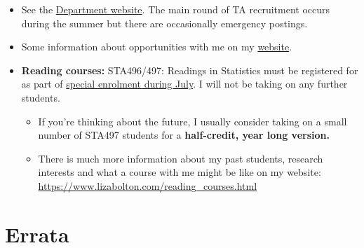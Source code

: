 \documentclass[
  openany]{book}
\begin{document}
\begin{itemize}
\item
  See the \href{https://www.statistics.utoronto.ca/employment-opportunities/cupe-positions-unit-1}{Department website}. The main round of TA recruitment occurs during the summer but there are occasionally emergency postings.
\item
  Some information about opportunities with me on my \href{https://www.lizabolton.com/opportunities.html}{website}.
\item
  \textbf{Reading courses:} STA496/497: Readings in Statistics must be registered for as part of \href{https://utoronto.sharepoint.com/sites/ArtSci-STA/Undergrad/SitePages/Special-Enrolment-Courses--STA490Y1,-STA492H1-and-STA496H1-STA497H1.aspx}{special enrolment during July}. I will not be taking on any further students.

  \begin{itemize}
  \item
    If you're thinking about the future, I usually consider taking on a small number of STA497 students for a \textbf{half-credit, year long version.}
  \item
    There is much more information about my past students, research interests and what a course with me might be like on my website: \url{https://www.lizabolton.com/reading_courses.html}
  \end{itemize}
\end{itemize}

\hypertarget{errata}{%
\section{Errata}\label{errata}}
\end{document}
